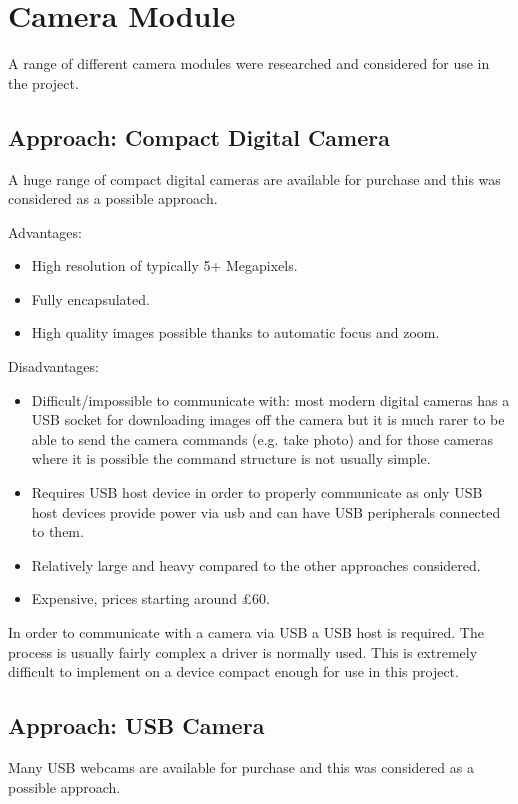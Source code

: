 \section{Camera Module}
\label{sec:John_options}

A range of different camera modules were researched and considered for use in the project.

\subsection{Approach: Compact Digital Camera}
\label{sec:Compact_option}
A huge range of compact digital cameras are available for purchase and this was considered as a possible approach.

Advantages:
      \begin{itemize}
         \item High resolution of typically 5+ Megapixels.
		 \item Fully encapsulated.
		 \item High quality images possible thanks to automatic focus and zoom.
     \end{itemize}

Disadvantages:
     \begin{itemize}
        \item Difficult/impossible to communicate with: most modern digital cameras has a USB socket for downloading images off the camera but it is much rarer to be able to send the camera commands (e.g. take photo) and for those cameras where it is possible the command structure is not usually simple.
        \item Requires USB host device in order to properly communicate as only USB host devices provide power via usb and can have USB peripherals connected to them.
	\item Relatively large and heavy compared to the other approaches considered.
	\item Expensive, prices starting around \pounds 60.
     \end{itemize}

In order to communicate with a camera via USB a USB host is required. The process is usually fairly complex a driver is normally used. This is extremely difficult to implement on a device compact enough for use in this project.

\subsection{Approach: USB Camera}
\label{sec:USB_option}
Many USB webcams are available for purchase and this was considered as a possible approach.

